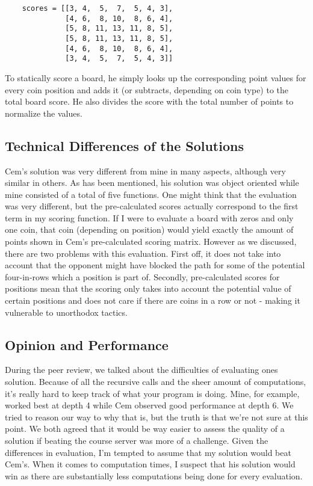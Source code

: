 \documentclass[a4paper]{article}
\begin{document}
\newpage
\begin{verbatim}
    scores = [[3, 4,  5,  7,  5, 4, 3],
              [4, 6,  8, 10,  8, 6, 4],
              [5, 8, 11, 13, 11, 8, 5],
              [5, 8, 11, 13, 11, 8, 5],
              [4, 6,  8, 10,  8, 6, 4],
              [3, 4,  5,  7,  5, 4, 3]]
\end{verbatim}

To statically score a board, he simply looks up the corresponding point values for every coin position and adds it (or subtracts, depending on coin type) to the total board score. He also divides the score with the total number of points to normalize the values.

\subsection{Technical Differences of the Solutions}
Cem's solution was very different from mine in many aspects, although very similar in others. As has been mentioned, his solution was object oriented while mine consisted of a total of five functions. One might think that the evaluation was very different, but the pre-calculated scores actually correspond to the first term in my scoring function. If I were to evaluate a board with zeros and only one coin, that coin (depending on position) would yield exactly the amount of points shown in Cem's pre-calculated scoring matrix. However as we discussed, there are two problems with this evaluation. First off, it does not take into account that the opponent might have blocked the path for some of the potential four-in-rows which a position is part of. Secondly, pre-calculated scores for positions mean that the scoring only takes into account the potential value of certain positions and does not care if there are coins in a row or not - making it vulnerable to unorthodox tactics.

\subsection{Opinion and Performance}
During the peer review, we talked about the difficulties of evaluating ones solution. Because of all the recursive calls and the sheer amount of computations, it's really hard to keep track of what your program is doing. Mine, for example, worked best at depth 4 while Cem observed good performance at depth 6. We tried to reason our way to why that is, but the truth is that we're not sure at this point. We both agreed that it would be way easier to assess the quality of a solution if beating the course server was more of a challenge. Given the differences in evaluation, I'm tempted to assume that my solution would beat Cem's. When it comes to computation times, I suspect that his solution would win as there are substantially less computations being done for every evaluation.
\end{document}
